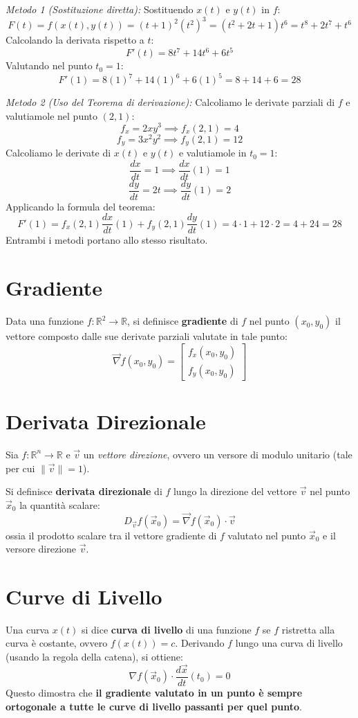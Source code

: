 \textit{Metodo 1 (Sostituzione diretta):}
Sostituendo $x(t)$ e $y(t)$ in $f$:
\[ F(t) = f(x(t), y(t)) = (t+1)^2 (t^2)^3 = (t^2+2t+1)t^6 = t^8 + 2t^7 + t^6 \]
Calcolando la derivata rispetto a $t$:
\[ F'(t) = 8t^7 + 14t^6 + 6t^5 \]
Valutando nel punto $t_0 = 1$:
\[ F'(1) = 8(1)^7 + 14(1)^6 + 6(1)^5 = 8 + 14 + 6 = 28 \]

\textit{Metodo 2 (Uso del Teorema di derivazione):}
Calcoliamo le derivate parziali di $f$ e valutiamole nel punto $(2,1)$:
\[ f_x = 2xy^3 \implies f_x(2,1) = 4 \]
\[ f_y = 3x^2y^2 \implies f_y(2,1) = 12 \]
Calcoliamo le derivate di $x(t)$ e $y(t)$ e valutiamole in $t_0 = 1$:
\[ \frac{dx}{dt} = 1 \implies \frac{dx}{dt}(1) = 1 \]
\[ \frac{dy}{dt} = 2t \implies \frac{dy}{dt}(1) = 2 \]
Applicando la formula del teorema:
\[ F'(1) = f_x(2,1) \frac{dx}{dt}(1) + f_y(2,1) \frac{dy}{dt}(1) = 4 \cdot 1 + 12 \cdot 2 = 4 + 24 = 28 \]
Entrambi i metodi portano allo stesso risultato.

\section{Gradiente}
Data una funzione $f: \mathbb{R}^2 \to \mathbb{R}$, si definisce \textbf{gradiente} di $f$ nel punto $(x_0, y_0)$ il vettore composto dalle sue derivate parziali valutate in tale punto:
\[ \vec{\nabla}f(x_0, y_0) = \begin{bmatrix} f_x(x_0, y_0) \\ f_y(x_0, y_0) \end{bmatrix} \]

\section{Derivata Direzionale}
Sia $f: \mathbb{R}^n \to \mathbb{R}$ e $\vec{v}$ un \textit{vettore direzione}, ovvero un versore di modulo unitario (tale per cui $\|\vec{v}\| = 1$). 

Si definisce \textbf{derivata direzionale} di $f$ lungo la direzione del vettore $\vec{v}$ nel punto $\vec{x}_0$ la quantità scalare:
\[ D_{\vec{v}}f(\vec{x}_0) = \vec{\nabla}f(\vec{x}_0) \cdot \vec{v} \]
ossia il prodotto scalare tra il vettore gradiente di $f$ valutato nel punto $\vec{x}_0$ e il versore direzione $\vec{v}$.

\section{Curve di Livello}
Una curva $x(t)$ si dice \textbf{curva di livello} di una funzione $f$ se $f$ ristretta alla curva è costante, ovvero $f(x(t)) = c$. 
Derivando $f$ lungo una curva di livello (usando la regola della catena), si ottiene:
\[ \nabla f(\vec{x}_0) \cdot \frac{d\vec{x}}{dt}(t_0) = 0 \]
Questo dimostra che \textbf{il gradiente valutato in un punto è sempre ortogonale a tutte le curve di livello passanti per quel punto}.

